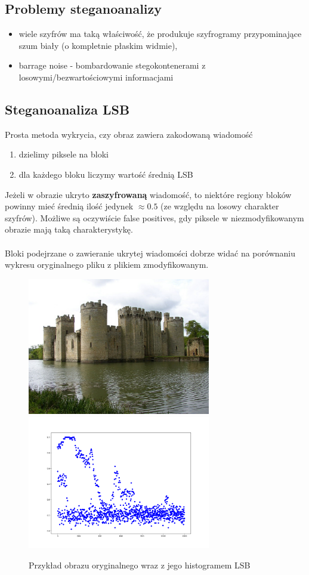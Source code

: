 \documentclass{article}
\begin{document}
\subsection{Problemy steganoanalizy}
\begin{itemize}
	\item wiele szyfrów ma taką właściwość, że produkuje szyfrogramy przypominające szum biały (o kompletnie płaskim widmie),
	\item barrage noise - bombardowanie stegokontenerami z losowymi/bezwartościowymi informacjami
\end{itemize}
\subsection{Steganoanaliza LSB}
Prosta metoda wykrycia, czy obraz zawiera zakodowaną wiadomość
\begin{enumerate}
	\item dzielimy piksele na bloki
	\item dla każdego bloku liczymy wartość średnią LSB
\end{enumerate}
Jeżeli w obrazie ukryto \textbf{zaszyfrowaną} wiadomość, to niektóre regiony bloków
powinny mieć średnią ilość jedynek $\approx 0.5$ (ze względu na losowy charakter szyfrów). Możliwe są
oczywiście false positives, gdy piksele w niezmodyfikowanym obrazie mają taką charakterystykę.
\\\\
Bloki podejrzane o zawieranie ukrytej wiadomości dobrze widać na porównaniu wykresu oryginalnego pliku z plikiem zmodyfikowanym.
\begin{figure}[H]
	\centering
	\includegraphics[width=8cm]{original_castle.jpg}
	\includegraphics[width=8cm]{original_hist.png}
	\caption{Przykład obrazu oryginalnego wraz z jego histogramem LSB}
\end{figure}
\end{document}
